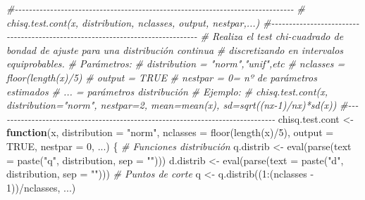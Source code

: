 \documentclass[
]{book}
\newenvironment{Shaded}{\begin{snugshade}}{\end{snugshade}}
\newcommand{\AttributeTok}[1]{\textcolor[rgb]{0.77,0.63,0.00}{#1}}
\newcommand{\CommentTok}[1]{\textcolor[rgb]{0.56,0.35,0.01}{\textit{#1}}}
\newcommand{\ConstantTok}[1]{\textcolor[rgb]{0.00,0.00,0.00}{#1}}
\newcommand{\ControlFlowTok}[1]{\textcolor[rgb]{0.13,0.29,0.53}{\textbf{#1}}}
\newcommand{\DecValTok}[1]{\textcolor[rgb]{0.00,0.00,0.81}{#1}}
\newcommand{\FunctionTok}[1]{\textcolor[rgb]{0.00,0.00,0.00}{#1}}
\newcommand{\NormalTok}[1]{#1}
\newcommand{\OtherTok}[1]{\textcolor[rgb]{0.56,0.35,0.01}{#1}}
\newcommand{\SpecialCharTok}[1]{\textcolor[rgb]{0.00,0.00,0.00}{#1}}
\newcommand{\StringTok}[1]{\textcolor[rgb]{0.31,0.60,0.02}{#1}}
\theoremstyle{break}
\theoremstyle{definition}
\theoremstyle{definition}
\theoremstyle{definition}
\theoremstyle{definition}
\theoremstyle{remark}
\begin{document}
\begin{Shaded}
\begin{Highlighting}[]
\CommentTok{\#{-}{-}{-}{-}{-}{-}{-}{-}{-}{-}{-}{-}{-}{-}{-}{-}{-}{-}{-}{-}{-}{-}{-}{-}{-}{-}{-}{-}{-}{-}{-}{-}{-}{-}{-}{-}{-}{-}{-}{-}{-}{-}{-}{-}{-}{-}{-}{-}{-}{-}{-}{-}{-}{-}{-}{-}{-}{-}{-}{-}{-}{-}{-}{-}{-}{-}{-}{-}{-}{-}{-}{-}{-}{-}{-}{-}{-}{-}{-}}
\CommentTok{\# chisq.test.cont(x, distribution, nclasses, output, nestpar,...)}
\CommentTok{\#{-}{-}{-}{-}{-}{-}{-}{-}{-}{-}{-}{-}{-}{-}{-}{-}{-}{-}{-}{-}{-}{-}{-}{-}{-}{-}{-}{-}{-}{-}{-}{-}{-}{-}{-}{-}{-}{-}{-}{-}{-}{-}{-}{-}{-}{-}{-}{-}{-}{-}{-}{-}{-}{-}{-}{-}{-}{-}{-}{-}{-}{-}{-}{-}{-}{-}{-}{-}{-}{-}{-}{-}{-}{-}{-}{-}{-}{-}{-}}
\CommentTok{\# Realiza el test chi{-}cuadrado de bondad de ajuste para una distribución continua}
\CommentTok{\# discretizando en intervalos equiprobables.}
\CommentTok{\# Parámetros:}
\CommentTok{\#   distribution = "norm","unif",etc}
\CommentTok{\#   nclasses = floor(length(x)/5)}
\CommentTok{\#   output = TRUE}
\CommentTok{\#   nestpar = 0= nº de parámetros estimados}
\CommentTok{\#   ... = parámetros distribución}
\CommentTok{\# Ejemplo:}
\CommentTok{\#   chisq.test.cont(x, distribution="norm", nestpar=2, mean=mean(x), sd=sqrt((nx{-}1)/nx)*sd(x))}
\CommentTok{\#{-}{-}{-}{-}{-}{-}{-}{-}{-}{-}{-}{-}{-}{-}{-}{-}{-}{-}{-}{-}{-}{-}{-}{-}{-}{-}{-}{-}{-}{-}{-}{-}{-}{-}{-}{-}{-}{-}{-}{-}{-}{-}{-}{-}{-}{-}{-}{-}{-}{-}{-}{-}{-}{-}{-}{-}{-}{-}{-}{-}{-}{-}{-}{-}{-}{-}{-}{-}{-}{-}{-}{-}{-}{-}{-}{-}{-}{-}{-}}
\NormalTok{chisq.test.cont }\OtherTok{\textless{}{-}} \ControlFlowTok{function}\NormalTok{(x, }\AttributeTok{distribution =} \StringTok{"norm"}\NormalTok{, }\AttributeTok{nclasses =} \FunctionTok{floor}\NormalTok{(}\FunctionTok{length}\NormalTok{(x)}\SpecialCharTok{/}\DecValTok{5}\NormalTok{), }
    \AttributeTok{output =} \ConstantTok{TRUE}\NormalTok{, }\AttributeTok{nestpar =} \DecValTok{0}\NormalTok{, ...) \{}
    \CommentTok{\# Funciones distribución}
\NormalTok{    q.distrib }\OtherTok{\textless{}{-}} \FunctionTok{eval}\NormalTok{(}\FunctionTok{parse}\NormalTok{(}\AttributeTok{text =} \FunctionTok{paste}\NormalTok{(}\StringTok{"q"}\NormalTok{, distribution, }\AttributeTok{sep =} \StringTok{""}\NormalTok{)))}
\NormalTok{    d.distrib }\OtherTok{\textless{}{-}} \FunctionTok{eval}\NormalTok{(}\FunctionTok{parse}\NormalTok{(}\AttributeTok{text =} \FunctionTok{paste}\NormalTok{(}\StringTok{"d"}\NormalTok{, distribution, }\AttributeTok{sep =} \StringTok{""}\NormalTok{)))}
    \CommentTok{\# Puntos de corte}
\NormalTok{    q }\OtherTok{\textless{}{-}} \FunctionTok{q.distrib}\NormalTok{((}\DecValTok{1}\SpecialCharTok{:}\NormalTok{(nclasses }\SpecialCharTok{{-}} \DecValTok{1}\NormalTok{))}\SpecialCharTok{/}\NormalTok{nclasses, ...)}

\end{Highlighting}
\end{Shaded}
\end{document}
